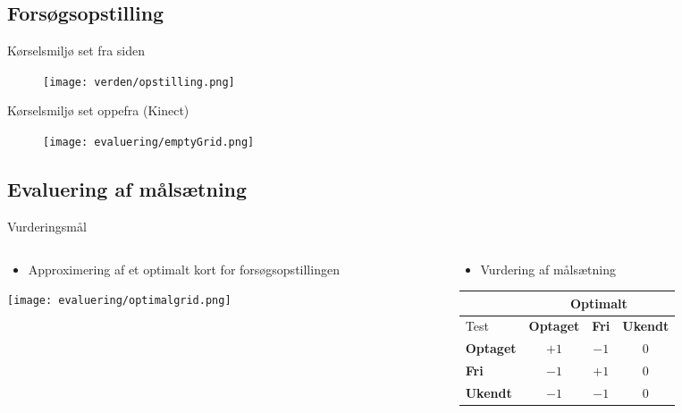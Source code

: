 \subsection{Forsøgsopstilling}
\begin{frame}[fragile]{Kørselsmiljø set fra siden}
	\begin{figure}
		\texttt{[image: verden/opstilling.png]}
	\end{figure}
\end{frame}

\begin{frame}[fragile]{Kørselsmiljø set oppefra (Kinect)}
	\begin{figure}
		\texttt{[image: evaluering/emptyGrid.png]}
	\end{figure}
\end{frame}

\subsection{Evaluering af målsætning}
\begin{frame}[fragile]{Vurderingsmål}
	\linespace
	\begin{columns}
		\begin{column}{0.4\textwidth}
			\begin{itemize}
				\item Approximering af et optimalt kort for forsøgsopstillingen
			\end{itemize}
			\linespace
			\texttt{[image: evaluering/optimalgrid.png]}
		\end{column}
		
		\pause
		
		\begin{column}{0.6\textwidth}
			\begin{itemize}
				\item Vurdering af målsætning
			\end{itemize}
			\linespace
			\begin{tabular}{|l|c|c|c|}
			\hline
			& \multicolumn{3}{|c|}{Optimalt} \\
			\hline
			Test & \textbf{Optaget} & \textbf{Fri} & \textbf{Ukendt} \\ \hline
			\textbf{Optaget} & $+1$ & $-1$ & $0$ \\ \hline
			\textbf{Fri} & $-1$ & $+1$ & $0$ \\ \hline
			\textbf{Ukendt} & $-1$ & $-1$ & $0$ \\ \hline
			\end{tabular}
		\end{column}
\end{columns}
\end{frame}

